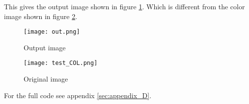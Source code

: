 This gives the output image shown in figure \ref{fig:output}. Which is different from the color image shown in figure \ref{fig:original}.

\begin{figure}[ht]
\centering
\texttt{[image: out.png]}
\caption{Output image}
\label{fig:output}
\end{figure}

\begin{figure}[ht]
\centering
\texttt{[image: test\_COL.png]}
\caption{Original image}
\label{fig:original}
\end{figure}

For the full code see appendix \ref{sec:appendix_D}.